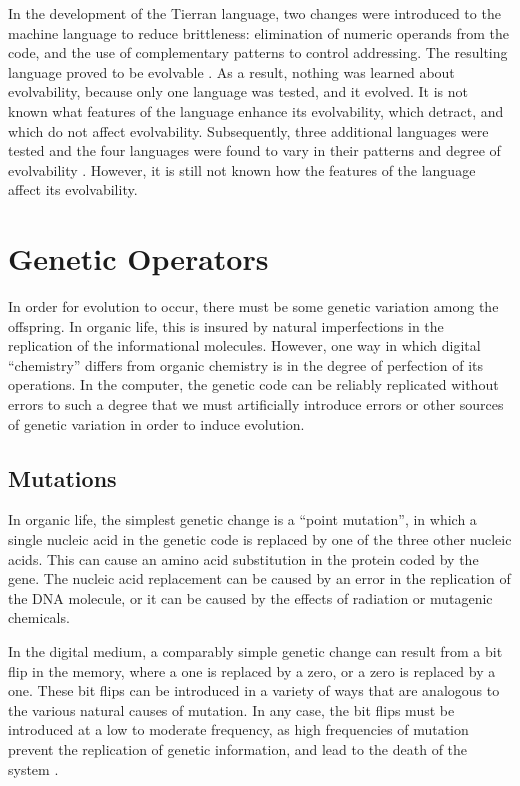 In the development of the Tierran language,
two changes were introduced to the machine language to reduce
brittleness: elimination of numeric operands from the code, and the
use of complementary patterns to control addressing.  The resulting
language proved to be evolvable \cite{Ray91a}.  As a result, nothing
was learned about evolvability, because only one language was tested,
and it evolved.  It is not known what features of the language
enhance its evolvability, which detract, and which do not affect
evolvability.  Subsequently, three additional languages were tested
and the four languages were found to vary in their patterns and
degree of evolvability \cite{RaySu}.  However, it is still not known
how the features of the language affect its evolvability.

\section{Genetic Operators}

In order for evolution to occur, there must be some genetic variation
among the offspring.  In organic life, this is insured by natural
imperfections in the replication of the informational molecules.
However, one way in which digital ``chemistry'' differs from organic
chemistry is in the degree of perfection of its operations.  In the
computer, the genetic code can be reliably replicated without errors
to such a degree that we must artificially introduce errors or other
sources of genetic variation in order to induce evolution.

\subsection{Mutations}

In organic life, the simplest genetic change is a ``point mutation'',
in which a single nucleic acid in the genetic code is replaced by one
of the three other nucleic acids.  This can cause an amino acid
substitution in the protein coded by the gene.  The nucleic acid
replacement can be caused by an error in the replication of the DNA
molecule, or it can be caused by the effects of radiation or mutagenic
chemicals.

In the digital medium, a comparably simple genetic change can result
from a bit flip in the memory, where a one is replaced by a zero, or
a zero is replaced by a one.  These bit flips can be introduced in a
variety of ways that are analogous to the various natural causes of
mutation.  In any case, the bit flips must be introduced at a low to
moderate frequency, as high frequencies of mutation prevent the
replication of genetic information, and lead to the death of the system
\cite{Ray91d}.

